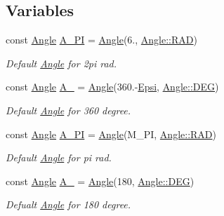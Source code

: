 \subsection*{Variables}
\begin{DoxyCompactItemize}
\item 
const \mbox{\hyperlink{class_angle}{Angle}} \mbox{\hyperlink{maths_8hh_aa20a472b33e6aab45228fe60a82ffedb}{A\+\_\+PI}} = \mbox{\hyperlink{class_angle}{Angle}}(6., \mbox{\hyperlink{class_angle_a4f7b9849ce8780bcba95ca3ee45cff77a93ab6b68075fd7a6fe724fbde5b13c1f}{Angle\+::\+R\+AD}})
\begin{DoxyCompactList}\small\item\em Default \mbox{\hyperlink{class_angle}{Angle}} for 2pi rad. \end{DoxyCompactList}\item 
const \mbox{\hyperlink{class_angle}{Angle}} \mbox{\hyperlink{maths_8hh_a384a4f113909fe28d36a0393c7abaff6}{A\+\_}} = \mbox{\hyperlink{class_angle}{Angle}}(360.-\/\mbox{\hyperlink{maths_8hh_a78802b279ab85021d7f6bffe51621703}{Epsi}}, \mbox{\hyperlink{class_angle_a4f7b9849ce8780bcba95ca3ee45cff77a65e2aa4bc05730c9c2e8fdaf73612282}{Angle\+::\+D\+EG}})
\begin{DoxyCompactList}\small\item\em Default \mbox{\hyperlink{class_angle}{Angle}} for 360 degree. \end{DoxyCompactList}\item 
const \mbox{\hyperlink{class_angle}{Angle}} \mbox{\hyperlink{maths_8hh_a34beede535fdcd8e9e75481293dbdc3c}{A\+\_\+\+PI}} = \mbox{\hyperlink{class_angle}{Angle}}(M\+\_\+\+PI, \mbox{\hyperlink{class_angle_a4f7b9849ce8780bcba95ca3ee45cff77a93ab6b68075fd7a6fe724fbde5b13c1f}{Angle\+::\+R\+AD}})
\begin{DoxyCompactList}\small\item\em Default \mbox{\hyperlink{class_angle}{Angle}} for pi rad. \end{DoxyCompactList}\item 
const \mbox{\hyperlink{class_angle}{Angle}} \mbox{\hyperlink{maths_8hh_af0de24ebfa2a377a714a53aed992cbaa}{A\+\_}} = \mbox{\hyperlink{class_angle}{Angle}}(180, \mbox{\hyperlink{class_angle_a4f7b9849ce8780bcba95ca3ee45cff77a65e2aa4bc05730c9c2e8fdaf73612282}{Angle\+::\+D\+EG}})
\begin{DoxyCompactList}\small\item\em Defualt \mbox{\hyperlink{class_angle}{Angle}} for 180 degree. \end{DoxyCompactList}\end{DoxyCompactItemize}


